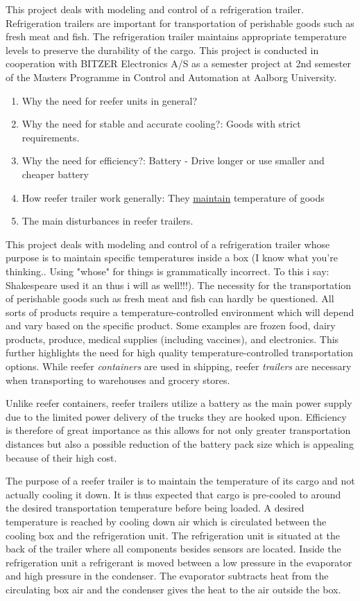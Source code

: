 This project deals with modeling and control of a refrigeration trailer. Refrigeration trailers are important for transportation of perishable goods such as fresh meat and fish. The refrigeration trailer maintains appropriate temperature levels to preserve the durability of the cargo.
This project is conducted in cooperation with BITZER Electronics A/S as a semester project at 2nd semester of the Masters Programme in Control and Automation at Aalborg University.

\begin{enumerate}
	\item Why the need for reefer units in general?
	\item Why the need for stable and accurate cooling?: Goods with strict requirements.
	\item Why the need for efficiency?: Battery - Drive longer or use smaller and cheaper battery
	\item How reefer trailer work generally: They \underline{maintain} temperature of goods
	\item The main disturbances in reefer trailers.
\end{enumerate}

This project deals with modeling and control of a refrigeration trailer whose purpose is to maintain specific temperatures inside a box (I know what you're thinking.. Using "whose" for things is grammatically incorrect. To this i say: Shakespeare used it an thus i will as well!!!). The necessity for the transportation of perishable goods such as fresh meat and fish can hardly be questioned. All sorts of products require a temperature-controlled environment which will depend and vary based on the specific product. Some examples are frozen food, dairy products, produce, medical supplies (including vaccines), and electronics. This further highlights the need for high quality temperature-controlled transportation options. While reefer \textit{containers} are used in shipping, reefer \textit{trailers} are necessary when transporting to warehouses and grocery stores.

Unlike reefer containers, reefer trailers utilize a battery as the main power supply due to the limited power delivery of the trucks they are hooked upon. Efficiency is therefore of great importance as this allows for not only greater transportation distances but also a possible reduction of the battery pack size which is appealing because of their high cost.

The purpose of a reefer trailer is to maintain the temperature of its cargo and not actually cooling it down. It is thus expected that cargo is pre-cooled to around the desired transportation temperature before being loaded. A desired temperature is reached by cooling down air which is circulated between the cooling box and the refrigeration unit. The refrigeration unit is situated at the back of the trailer where all components besides sensors are located. Inside the refrigeration unit a refrigerant is moved between a low pressure in the evaporator and high pressure in the condenser. The evaporator subtracts heat from the circulating box air and the condenser gives the heat to the air outside the box.